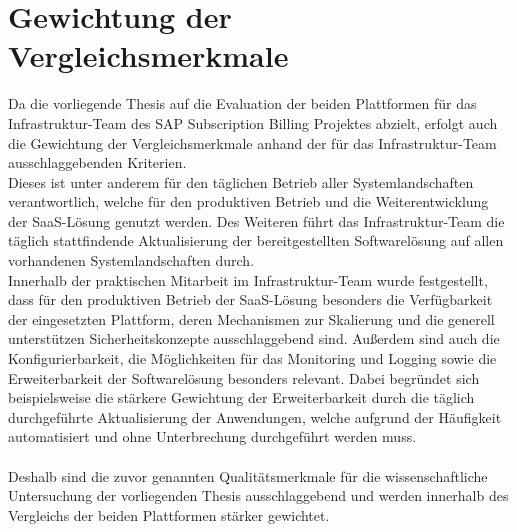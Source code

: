 \section{Gewichtung der Vergleichsmerkmale}
\label{gewichtung_merkmale}
Da die vorliegende Thesis auf die Evaluation der beiden Plattformen für das Infrastruktur-Team des SAP Subscription Billing Projektes abzielt, erfolgt auch die Gewichtung der Vergleichsmerkmale anhand der für das Infrastruktur-Team ausschlaggebenden Kriterien.\\ 
Dieses ist unter anderem für den täglichen Betrieb aller Systemlandschaften verantwortlich, welche für den produktiven Betrieb und die Weiterentwicklung der \ac{SaaS}-Lösung genutzt werden. Des Weiteren führt das Infrastruktur-Team die täglich stattfindende Aktualisierung der bereitgestellten Softwarelösung auf allen vorhandenen Systemlandschaften durch.\\ 
Innerhalb der praktischen Mitarbeit im Infrastruktur-Team wurde festgestellt, dass für den produktiven Betrieb der \ac{SaaS}-Lösung besonders die Verfügbarkeit der eingesetzten Plattform, deren Mechanismen zur Skalierung und die generell unterstützen Sicherheitskonzepte ausschlaggebend sind. Außerdem sind auch die Konfigurierbarkeit, die Möglichkeiten für das Monitoring und Logging sowie die Erweiterbarkeit der Softwarelösung besonders relevant. Dabei begründet sich beispielsweise die stärkere Gewichtung der Erweiterbarkeit durch die täglich durchgeführte Aktualisierung der Anwendungen, welche aufgrund der Häufigkeit automatisiert und ohne Unterbrechung durchgeführt werden muss.\\
\\
Deshalb sind die zuvor genannten Qualitätsmerkmale für die wissenschaftliche Untersuchung der vorliegenden Thesis ausschlaggebend und werden innerhalb des Vergleichs der beiden Plattformen stärker gewichtet.
\begin{comment}
	Aus der Sicht des Anwenders der Software wird die Gewichtung der Merkmale basierend auf den Ergebnissen der Forschung von Claus-Peter H. Ernst und Franz Rothlauf, welche im Jahr 2012 die potentiellen Erfolgsfaktoren von \ac{SaaS}-Unternehmen mittels des damaligen Forschungsstandes gesammelt und zusammengefasst haben, durchgeführt.\\
	Laut Claus-Peter H. Ernst und Franz Rothlauf sind aus Sicht des Anwenders primär die für die Benutzung des \ac{SaaS}-Angebots anfallenden Kosten sowie die Sicherheit der Daten ausschlaggebend.\autocite[Vgl.][S. 5]{Ernst.2012}
	Jedoch sollte dies aufgrund der Weiterentwicklungen innerhalb des vergangenen Jahren nicht als vollumfängliches Ergebnis gesehen werden, da besonders die Verfügbarkeit auch für den Anwender der \ac{SaaS}-Lösung wesentlich ist.\\
	\\
	Insgesamt kann durch die zuvor aufgezeigten Interessengruppen und deren ausschlaggebenden Qualitätsmerkmale für die Auswahl einer Plattform zur Bereitstellung einer \ac{SaaS}-Lösung die stärkere Gewichtung der zuvor aufgezählten Merkmale für die wissenschaftliche Untersuchung der vorliegenden Thesis angenommen werden. 
\end{comment}

 

